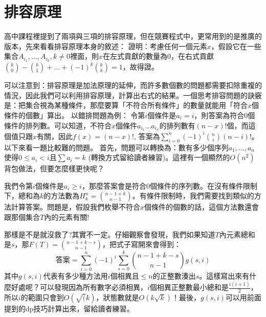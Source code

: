 \section{排容原理}
高中課程裡提到了兩項與三項的排容原理，但在競賽程式中，更常用到的是推廣的版本，先來看看排容原理本身的敘述：
證明：考慮任何一個元素$x$，假設它在一些集合$A_{i_1}, \dots, A_{i_k}, k \neq 0$裡面，則$x$在左式貢獻的數量為$0$，在右式貢獻$\binom{k}{0} - \binom{k}{1} + \dots + (-1)^{k}\binom{k}{k} = 1$，故得證。
\\
\par 可以注意到：排容原理是加法原理的延伸，而許多數個數的問題都需要扣除重複的情況，因此我們可以利用排容原理，計算出右式的結果。一個思考排容問題的訣竅是：把集合視為某種條件，那麼要算「不符合所有條件」的數量就能用「符合$x$個條件的個數」算出。
以錯排問題為例：
令第$i$個條件是$a_i = i$，則答案為符合$0$個條件的排列數。可以知道，不符合$x$個條件$a_{i_1} \dots a_{i_x}$的排列數有$(n-x)!$個，而這個值只跟$x$有關，因此$f(x) = (n-x)!$, 答案為$\sum_{i=0}^n (-1)^i \binom{n}{i}(n-i)!$。\\

以下來看一題比較難的問題。
首先，問題可以轉換為：數有多少個序列$a_1, \dots, a_n$使得$0 \leq a_i < i$且$\sum a_i = k$ (轉換方式留給讀者練習)。這裡有一個顯然的$O(n^2)$背包做法，但要怎麼樣更快呢？
\par 我們令第$i$個條件是$a_i \geq i$，那麼答案會是符合$0$個條件的序列數。在沒有條件限制下，總和為$k$的方法數為$H_k^n = \binom{n-1+k}{n-1}$。有條件限制時，我們需要找到類似的方法計算答案。問題是，假設我們枚舉不符合$x$個條件的個數的話，這個方法數還會跟那個集合$T$內的元素有關!
\par 那樣是不是就沒救了?其實不一定。仔細觀察會發現，我們如果知道$T$內元素總和是$s$，那$F(T) = \binom{n-1+k-s}{n-1}$，把式子寫開來會得到：
\[\textbf{答案} = \sum_{i=0}^n (-1)^{i} \sum_{s=0}^k\binom{n-1+k-s}{n-1} g(s, i) \]
其中$g(s, i)$代表有多少種方法用$i$個相異且$\leq n$的正整數湊出$s$。這樣寫出來有什麼好處呢？可以發現因為所有數字必須相異，$i$個相異正整數最小總和是$\frac{i(i+1)}{2}$，所以$i$的範圍只會到$O(\sqrt(k)$，狀態數就是$O(k\sqrt k)$！最後，$g(s, i)$可以用前面提到的dp技巧計算出來，留給讀者練習。





